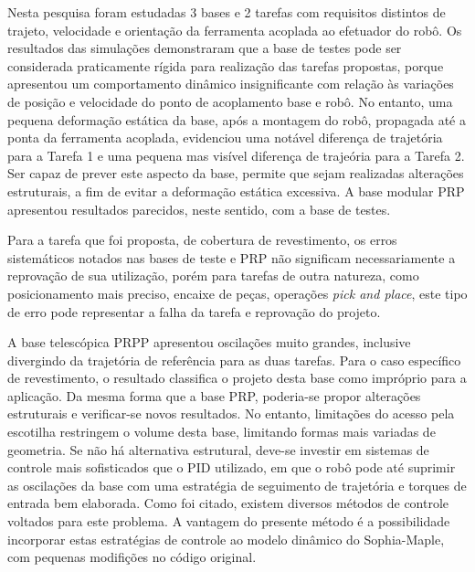 Nesta pesquisa foram estudadas 3 bases e 2 tarefas com requisitos distintos de
trajeto, velocidade e orientação da ferramenta acoplada ao efetuador do robô. Os
resultados das simulações demonstraram que a base de testes pode ser considerada
praticamente rígida para realização das tarefas propostas, porque apresentou um
comportamento dinâmico insignificante com relação às variações de posição e
velocidade do ponto de acoplamento base e robô. No entanto, uma pequena
deformação estática da base, após a montagem do robô, propagada até a ponta da
ferramenta acoplada, evidenciou uma notável diferença de trajetória para a
Tarefa 1 e uma pequena mas visível diferença de trajeória para a Tarefa 2.
Ser capaz de prever este aspecto da base, permite que sejam realizadas
alterações estruturais, a fim de evitar a deformação estática excessiva.
A base modular PRP apresentou resultados parecidos, neste sentido, com a base de
testes.

Para a tarefa que foi proposta, de cobertura de revestimento, os erros
sistemáticos notados nas bases de teste e PRP não significam necessariamente a
reprovação de sua utilização, porém para tarefas de outra natureza, como
posicionamento mais preciso, encaixe de peças, operações \textit{pick and
place}, este tipo de erro pode representar a falha da tarefa e reprovação do
projeto.

A base telescópica PRPP apresentou oscilações muito grandes, inclusive
divergindo da trajetória de referência para as duas tarefas. Para o caso
específico de revestimento, o resultado classifica o projeto desta base como
impróprio para a aplicação. Da mesma forma que a base PRP, poderia-se propor
alterações estruturais e verificar-se novos resultados. No entanto, limitações
do acesso pela escotilha restringem o volume desta base, limitando formas mais
variadas de geometria. Se não há alternativa estrutural, deve-se investir em
sistemas de controle mais sofisticados que o PID utilizado, em que o robô pode
até suprimir as oscilações da base com uma estratégia de seguimento de
trajetória e torques de entrada bem elaborada. Como foi citado, existem diversos
métodos de controle voltados para este problema. A vantagem do presente método é
a possibilidade incorporar estas estratégias de controle ao modelo dinâmico do
Sophia-Maple, com pequenas modifições no código original.







